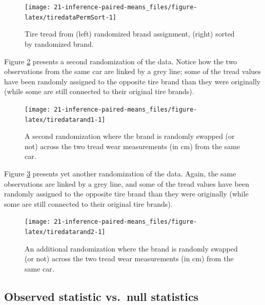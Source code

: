 \documentclass[
  10pt,
  openany]{book}
\begin{document}
\begin{figure}[h]

{\centering \texttt{[image: 21-inference-paired-means\_files/figure-latex/tiredataPermSort-1]} 

}

\caption{Tire tread from (left) randomized brand assignment, (right) sorted by randomized brand.}\label{fig:tiredataPermSort}
\end{figure}

Figure \ref{fig:tiredatarand1} presents a second randomization of the data.
Notice how the two observations from the same car are linked by a grey line; some of the tread values have been randomly assigned to the opposite tire brand than they were originally (while some are still connected to their original tire brands).

\begin{figure}[h]

{\centering \texttt{[image: 21-inference-paired-means\_files/figure-latex/tiredatarand1-1]} 

}

\caption{A second randomization where the brand is randomly swapped (or not) across the two tread wear measurements (in cm) from the same car.}\label{fig:tiredatarand1}
\end{figure}

Figure \ref{fig:tiredatarand2} presents yet another randomization of the data.
Again, the same observations are linked by a grey line, and some of the tread values have been randomly assigned to the opposite tire brand than they were originally (while some are still connected to their original tire brands).

\begin{figure}[h]

{\centering \texttt{[image: 21-inference-paired-means\_files/figure-latex/tiredatarand2-1]} 

}

\caption{An additional randomization where the brand is randomly swapped (or not) across the two tread wear measurements (in cm) from the same car.}\label{fig:tiredatarand2}
\end{figure}

\hypertarget{observed-statistic-vs.-null-statistics-7}{%
\subsection{Observed statistic vs.~null statistics}\label{observed-statistic-vs.-null-statistics-7}}
\end{document}
